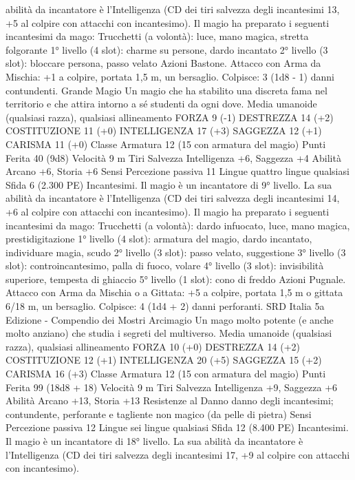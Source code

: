 \begin{multicols}{2}
abilità da incantatore è l’Intelligenza (CD dei tiri salvezza degli
incantesimi 13, +5 al colpire con attacchi con incantesimo). Il
magio ha preparato i seguenti incantesimi da mago:
Trucchetti (a volontà): luce, mano magica, stretta folgorante
1° livello (4 slot): charme su persone, dardo incantato
2° livello (3 slot): bloccare persona, passo velato
Azioni
Bastone. Attacco con Arma da Mischia: +1 a colpire, portata 1,5
m, un bersaglio.
Colpisce: 3 (1d8 - 1) danni contundenti.
Grande Magio
Un magio che ha stabilito una discreta fama nel
territorio e che attira intorno a sé studenti da ogni dove.
Media umanoide (qualsiasi razza), qualsiasi allineamento
FORZA 9 (-1)
DESTREZZA 14 (+2)
COSTITUZIONE 11 (+0)
INTELLIGENZA 17 (+3)
SAGGEZZA 12 (+1)
CARISMA 11 (+0)
Classe Armatura 12 (15 con armatura del magio)
Punti Ferita 40 (9d8)
Velocità 9 m
Tiri Salvezza Intelligenza +6, Saggezza +4
Abilità Arcano +6, Storia +6
Sensi Percezione passiva 11
Lingue quattro lingue qualsiasi
Sfida 6 (2.300 PE)
Incantesimi. Il magio è un incantatore di 9° livello. La sua
abilità da incantatore è l’Intelligenza (CD dei tiri salvezza degli
incantesimi 14, +6 al colpire con attacchi con incantesimo). Il
magio ha preparato i seguenti incantesimi da mago:
Trucchetti (a volontà): dardo infuocato, luce, mano magica,
prestidigitazione
1° livello (4 slot): armatura del magio, dardo incantato,
individuare magia, scudo
2° livello (3 slot): passo velato, suggestione
3° livello (3 slot): controincantesimo, palla di fuoco, volare
4° livello (3 slot): invisibilità superiore, tempesta di ghiaccio
5° livello (1 slot): cono di freddo
Azioni
Pugnale. Attacco con Arma da Mischia o a Gittata: +5 a colpire,
portata 1,5 m o gittata 6/18 m, un bersaglio.
Colpisce: 4 (1d4 + 2) danni perforanti.
SRD Italia 5a Edizione - Compendio dei Mostri
Arcimagio
Un mago molto potente (e anche molto anziano) che
studia i segreti del multiverso.
Media umanoide (qualsiasi razza), qualsiasi allineamento
FORZA 10 (+0)
DESTREZZA 14 (+2)
COSTITUZIONE 12 (+1)
INTELLIGENZA 20 (+5)
SAGGEZZA 15 (+2)
CARISMA 16 (+3)
Classe Armatura 12 (15 con armatura del magio)
Punti Ferita 99 (18d8 + 18)
Velocità 9 m
Tiri Salvezza Intelligenza +9, Saggezza +6
Abilità Arcano +13, Storia +13
Resistenze al Danno danno degli incantesimi; contundente,
perforante e tagliente non magico (da pelle di pietra)
Sensi Percezione passiva 12
Lingue sei lingue qualsiasi
Sfida 12 (8.400 PE)
Incantesimi. Il magio è un incantatore di 18° livello. La sua
abilità da incantatore è l’Intelligenza (CD dei tiri salvezza degli
incantesimi 17, +9 al colpire con attacchi con incantesimo).

\end{multicols}
